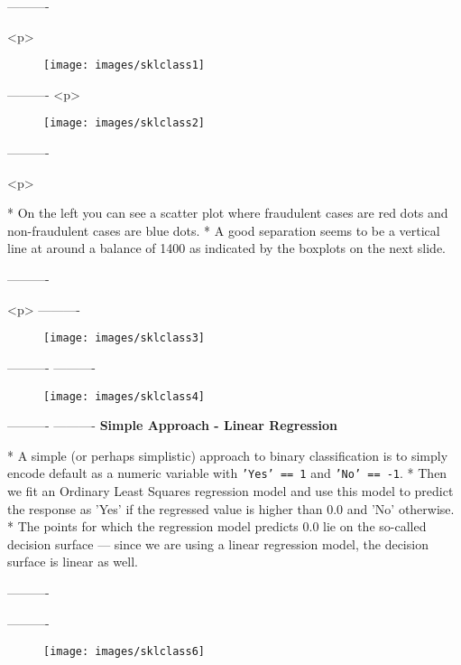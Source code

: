 ----------%

<p>
\begin{figure}[h!]
\centering
\texttt{[image: images/sklclass1]}

\end{figure}

----------%
<p>

\begin{figure}[h!]
\centering
\texttt{[image: images/sklclass2]}

\end{figure}

----------%

<p>
	
*   	On the left you can see a scatter plot where fraudulent cases are red dots and non-fraudulent cases are blue dots. 
*   A good separation seems to be a vertical line at around a balance of 1400 as indicated by the boxplots on the next slide.
	
	

----------%

<p>
----------%
	
	\begin{figure}[h!]
\centering
\texttt{[image: images/sklclass3]}

\end{figure}

	
----------%
\newpage
----------%
\begin{figure}[h!]
\centering
\texttt{[image: images/sklclass4]}

\end{figure}
----------%
----------%
	\newpage
\textbf{Simple Approach - Linear Regression}

*   A simple (or perhaps simplistic) approach to binary classification is to simply encode default as a numeric variable with \texttt{'Yes' == 1} and \texttt{'No' == -1}.
*   Then we fit an Ordinary Least Squares regression model and use this model to predict the response as 'Yes' if the regressed value is higher than 0.0 and 'No' otherwise. 
*   The points for which the regression model predicts 0.0 lie on the so-called decision surface — since we are using a linear regression model, the decision surface is linear as well.


----------%

----------%
\begin{figure}[h!]
\centering
\texttt{[image: images/sklclass6]}
\end{figure}


